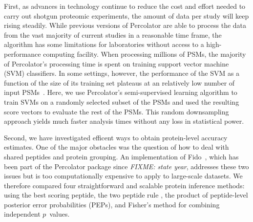 \documentclass{article}
\begin{document}
First, as advances in technology continue to reduce the cost and
effort needed to carry out shotgun proteomic experiments, the amount
of data per study will keep rising steadily. While previous versions
of Percolator are able to process the data from the vast majority of
current studies in a reasonable time frame, the algorithm has some
limitations for laboratories without access to a high-performance
computing facility. When processing millions of PSMs, the majority of
Percolator's processing time is spent on training support vector
machine (SVM) classifiers.  In some settings, however, the performance
of the SVM as a function of the size of its training set plateaus at
an relatively low number of input PSMs~\cite{gonnelli2015decoy}. Here,
we use Percolator's semi-supervised learning algorithm to train SVMs
on a randomly selected subset of the PSMs and used the resulting score
vectors to evaluate the rest of the PSMs.  This random downsampling
approach yields much faster analysis times without any loss in
statistical power.

Second, we have investigated efficent ways to obtain protein-level
accuracy estimates. One of the major obstacles was the question of how
to deal with shared peptides and protein grouping. An implementation
of Fido~\cite{serang2010efficient}, which has been part of the
Percolator package since {\em FIXME: state year}, addresses these two
issues but is too computationally expensive to apply to large-scale
datasets. We therefore compared four straightforward and scalable
protein inference methods: using the best scoring peptide, the two
peptide rule \cite{FIXME}, the product of peptide-level posterior
error probabilities (PEPs), and Fisher's method for combining
independent $p$~values.
\end{document}
